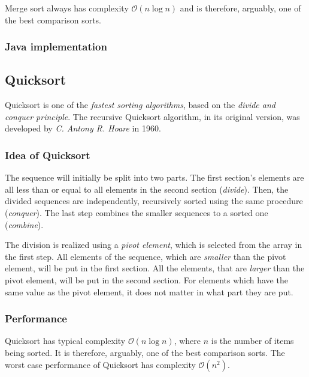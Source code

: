 \documentclass[]{pfBook}
\newcommand{\OO}{\mathcal{O}}
\begin{document}
	Merge sort always has complexity $\OO(n \log n)$ and is therefore, arguably, one of the best comparison sorts.
	
	\subsubsection{Java implementation}
	
	
	
	\subsection{Quicksort}
	
	Quicksort is one of the \emph{fastest sorting algorithms}, based on the \emph{divide and conquer principle}. The recursive Quicksort algorithm, in its original version, was developed by \emph{C. Antony R. Hoare} in 1960.
	
	\subsubsection{Idea of Quicksort}
	
	The sequence will initially be split into two parts. The first section's elements are all less than or equal to all elements in the second section (\emph{divide}). Then, the divided sequences are independently, recursively sorted using the same procedure (\emph{conquer}). The last step combines the smaller sequences to a sorted one (\emph{combine}).
	
	The division is realized using a \emph{pivot element}, which is selected from the array in the first step. All elements of the sequence, which are \emph{smaller} than the pivot element, will be put in the first section. All the elements, that are \emph{larger} than the pivot element, will be put in the second section. For elements which have the same value as the pivot element, it does not matter in what part they are put.
	
	\subsubsection{Performance}
	
	Quicksort has typical complexity $\OO(n \log n)$, where $n$ is the number of items being sorted. It is therefore, arguably, one of the best comparison sorts. The worst case performance of Quicksort has complexity $\OO(n^2)$.
	
\end{document}
